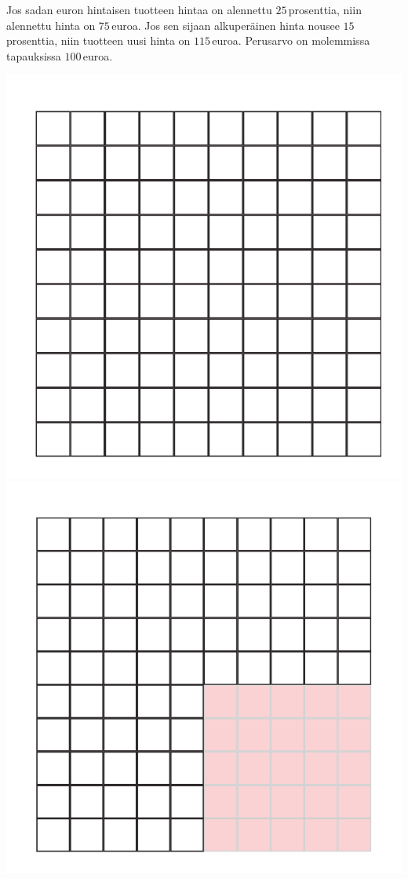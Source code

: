 \begin{esimerkki}
Jos sadan euron hintaisen tuotteen hintaa on alennettu $25$\,prosenttia, niin alennettu hinta on $75$\,euroa. Jos sen sijaan alkuperäinen hinta nousee $15$\,prosenttia, niin tuotteen uusi hinta on $115$\,euroa. Perusarvo on molemmissa tapauksissa $100$\,euroa.
    
    \begin{center}
        \includegraphics[scale=.25]{pictures/Kuva13-1-100.pdf}
        \includegraphics[scale=.25]{pictures/Kuva13-2-75.pdf}

\end{center}
\end{esimerkki}
